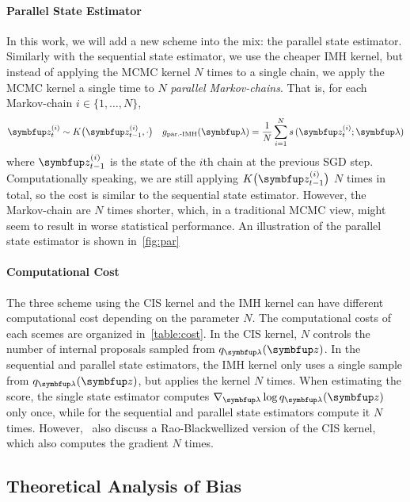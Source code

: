 \vspace{-0.05in}
\paragraph{Parallel State Estimator}
In this work, we will add a new scheme into the mix: the parallel state estimator.
Similarly with the sequential state estimator, we use the cheaper IMH kernel, but instead of applying the MCMC kernel \(N\) times to a single chain, we apply the MCMC kernel a single time to \(N\) \textit{parallel Markov-chains}.
That is, for each Markov-chain \(i \in \{1, \ldots, N\}\),
%
\vspace{-0.05in}
\begin{align}
  &\vz_{t}^{(i)} \sim K\big(\vz_{t-1}^{(i)}, \cdot \big) &g_{\text{par.-IMH}}(\vlambda) = \frac{1}{N} \sum_{i=1}^N s\,(\vz_{t}^{(i)}; \vlambda)
\end{align}
%
where \(\vz_{t-1}^{(i)}\) is the state of the \(i\)th chain at the previous SGD step.
Computationally speaking, we are still applying \(K\big(\vz_{t-1}^{(i)}\big)\) \(N\) times in total, so the cost is similar to the sequential state estimator.
However, the Markov-chain are \(N\) times shorter, which, in a traditional MCMC view, might seem to result in worse statistical performance.
An illustration of the parallel state estimator is shown in~\cref{fig:par}

%

%
\vspace{-0.05in}
\paragraph{Computational Cost}
The three scheme using the CIS kernel and the IMH kernel can have different computational cost depending on the parameter \(N\).
The computational costs of each scemes are organized in~\cref{table:cost}.
In the CIS kernel, \(N\) controls the number of internal proposals sampled from \(q_{\vlambda}(\vz)\).
In the sequential and parallel state estimators, the IMH kernel only uses a single sample from \(q_{\vlambda}(\vz)\), but applies the kernel \(N\) times.
When estimating the score, the single state estimator computes \(\nabla_{\vlambda} \log q_{\vlambda}(\vz)\) only once, while for the sequential and parallel state estimators compute it \(N\) times.
However,~\cite{NEURIPS2020_b2070693} also discuss a Rao-Blackwellized version of the CIS kernel, which also computes the gradient \(N\) times.

\subsection{Theoretical Analysis of Bias}\label{section:theory}

